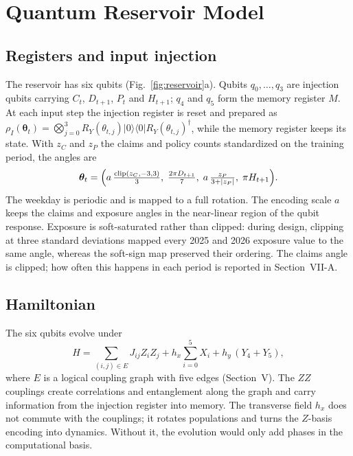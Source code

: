 \documentclass[journal]{IEEEtran}
\begin{document}
\section{Quantum Reservoir Model}
\subsection{Registers and input injection}
The reservoir has six qubits (Fig.~\ref{fig:reservoir}a). Qubits $q_0,\dots,q_3$ are injection qubits carrying $C_t$, $D_{t+1}$, $P_t$ and $H_{t+1}$; $q_4$ and $q_5$ form the memory register $M$. At each input step the injection register is reset and prepared as $\rho_I(\bm\theta_t)=\bigotimes_{j=0}^{3}R_Y(\theta_{t,j})|0\rangle\langle 0|R_Y(\theta_{t,j})^\dagger$, while the memory register keeps its state. With $z_C$ and $z_P$ the claims and policy counts standardized on the training period, the angles are
\begin{equation}
\bm\theta_t=\Bigl(a\,\tfrac{\mathrm{clip}(z_C,-3,3)}{3},\;\tfrac{2\pi D_{t+1}}{7},\;a\,\tfrac{z_P}{3+|z_P|},\;\pi H_{t+1}\Bigr).
\label{eq:enc}
\end{equation}
The weekday is periodic and is mapped to a full rotation. The encoding scale $a$ keeps the claims and exposure angles in the near-linear region of the qubit response. Exposure is soft-saturated rather than clipped: during design, clipping at three standard deviations mapped every 2025 and 2026 exposure value to the same angle, whereas the soft-sign map preserved their ordering. The claims angle is clipped; how often this happens in each period is reported in Section~VII-A.

\subsection{Hamiltonian}
The six qubits evolve under
\begin{equation}
H=\sum_{(i,j)\in E}J_{ij}Z_iZ_j+h_x\sum_{i=0}^{5}X_i+h_y\,(Y_4+Y_5),
\label{eq:ham}
\end{equation}
where $E$ is a logical coupling graph with five edges (Section~V). The $ZZ$ couplings create correlations and entanglement along the graph and carry information from the injection register into memory. The transverse field $h_x$ does not commute with the couplings; it rotates populations and turns the $Z$-basis encoding into dynamics. Without it, the evolution would only add phases in the computational basis.
\end{document}
